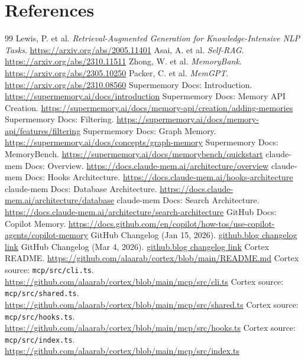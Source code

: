 \documentclass[10pt,twocolumn]{article}
\begin{document}
\section*{References}
\small
\sloppy
\begin{thebibliography}{99}
 Lewis, P. et al. \textit{Retrieval-Augmented Generation for Knowledge-Intensive NLP Tasks}. \url{https://arxiv.org/abs/2005.11401}
 Asai, A. et al. \textit{Self-RAG}. \url{https://arxiv.org/abs/2310.11511}
 Zhong, W. et al. \textit{MemoryBank}. \url{https://arxiv.org/abs/2305.10250}
 Packer, C. et al. \textit{MemGPT}. \url{https://arxiv.org/abs/2310.08560}
 Supermemory Docs: Introduction. \url{https://supermemory.ai/docs/introduction}
 Supermemory Docs: Memory API Creation. \url{https://supermemory.ai/docs/memory-api/creation/adding-memories}
 Supermemory Docs: Filtering. \url{https://supermemory.ai/docs/memory-api/features/filtering}
 Supermemory Docs: Graph Memory. \url{https://supermemory.ai/docs/concepts/graph-memory}
 Supermemory Docs: MemoryBench. \url{https://supermemory.ai/docs/memorybench/quickstart}
 claude-mem Docs: Overview. \url{https://docs.claude-mem.ai/architecture/overview}
 claude-mem Docs: Hooks Architecture. \url{https://docs.claude-mem.ai/hooks-architecture}
 claude-mem Docs: Database Architecture. \url{https://docs.claude-mem.ai/architecture/database}
 claude-mem Docs: Search Architecture. \url{https://docs.claude-mem.ai/architecture/search-architecture}
 GitHub Docs: Copilot Memory. \url{https://docs.github.com/en/copilot/how-tos/use-copilot-agents/copilot-memory}
 GitHub Changelog (Jan 15, 2026). \href{https://github.blog/changelog/2026-01-15-agentic-memory-for-github-copilot-is-in-public-preview/}{github.blog changelog link}
 GitHub Changelog (Mar 4, 2026). \href{https://github.blog/changelog/2026-03-04-copilot-memory-now-on-by-default-for-pro-and-pro-users-in-public-preview/}{github.blog changelog link}
 Cortex README. \url{https://github.com/alaarab/cortex/blob/main/README.md}
 Cortex source: \texttt{mcp/src/cli.ts}. \url{https://github.com/alaarab/cortex/blob/main/mcp/src/cli.ts}
 Cortex source: \texttt{mcp/src/shared.ts}. \url{https://github.com/alaarab/cortex/blob/main/mcp/src/shared.ts}
 Cortex source: \texttt{mcp/src/hooks.ts}. \url{https://github.com/alaarab/cortex/blob/main/mcp/src/hooks.ts}
 Cortex source: \texttt{mcp/src/index.ts}. \url{https://github.com/alaarab/cortex/blob/main/mcp/src/index.ts}
\end{thebibliography}
\fussy
\end{document}
